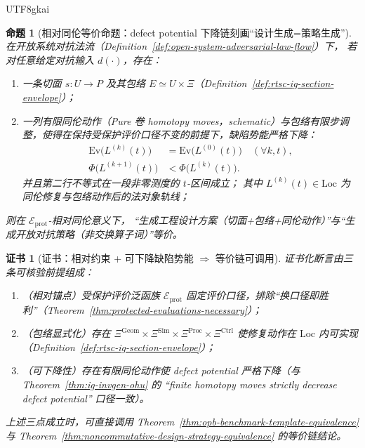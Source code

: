 \documentclass[12pt]{article}
\newtheorem{proposition}{命题}[section]
\newtheorem{certificate}{证书}[section]
\begin{document}
\begin{CJK*}{UTF8}{gkai}
\begin{proposition}[相对同伦等价命题：defect potential 下降链刻画“设计生成=策略生成”]
\label{prop:rtsc-ig-design-strategy-equivalence}
在开放系统对抗法流（Definition~\ref{def:open-system-adversarial-law-flow}）下，
若对任意给定对抗输入 $d(\cdot)$，存在：
\begin{enumerate}
  \item 一条切面 $s:U\to P$ 及其包络 $E\simeq U\times\Xi$（Definition~\ref{def:rtsc-ig-section-envelope}）；
  \item 一列有限同伦动作（Pure 卷 homotopy moves，schematic）与包络有限步调整，使得在保持受保护评价口径不变的前提下，缺陷势能严格下降：
  \[
  \begin{aligned}
  \mathrm{Ev}\bigl(L^{(k)}(t)\bigr) &= \mathrm{Ev}\bigl(L^{(0)}(t)\bigr)\quad(\forall k,t),\\
  \Phi\bigl(L^{(k+1)}(t)\bigr) &< \Phi\bigl(L^{(k)}(t)\bigr).
  \end{aligned}
  \]
  并且第二行不等式在一段非零测度的 $t$-区间成立；
  其中 $L^{(k)}(t)\in\mathrm{Loc}$ 为同伦修复与包络动作后的法对象轨线；
\end{enumerate}
则在 $\mathcal{E}_{\mathrm{prot}}$-相对同伦意义下，
“生成工程设计方案（切面+包络+同伦动作）”与“生成开放对抗策略（非交换算子词）”等价。
\end{proposition}

\begin{certificate}[证书：相对约束 + 可下降缺陷势能 $\Rightarrow$ 等价链可调用]
\label{cert:rtsc-ig-design-strategy-equivalence}
证书化断言由三条可核验前提组成：
\begin{enumerate}
  \item（相对锚点）受保护评价泛函族 $\mathcal{E}_{\mathrm{prot}}$ 固定评价口径，排除“换口径即胜利”（Theorem~\ref{thm:protected-evaluations-necessary}）；

  \item（包络显式化）存在 $\Xi^{\mathrm{Geom}}\times\Xi^{\mathrm{Sim}}\times\Xi^{\mathrm{Proc}}\times\Xi^{\mathrm{Ctrl}}$ 使修复动作在
    $\mathrm{Loc}$ 内可实现（Definition~\ref{def:rtsc-ig-section-envelope}）；
  \item（可下降性）存在有限同伦动作使 defect potential 严格下降（与 Theorem~\ref{thm:ig-invgen-ohu} 的 “finite homotopy moves strictly
    decrease defect potential” 口径一致）。
\end{enumerate}
上述三点成立时，可直接调用 Theorem~\ref{thm:opb-benchmark-template-equivalence} 与 Theorem~\ref{thm:noncommutative-design-strategy-equivalence} 的等价链结论。
\end{certificate}


\end{CJK*}
\end{document}
